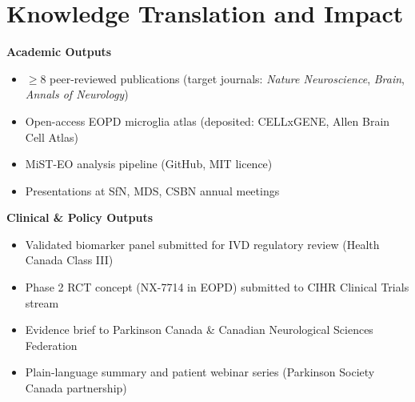 \section{Knowledge Translation and Impact}

\begin{tcolorbox}[cihrbox, title={\faRocket\enspace Expected Outputs and KT Pathways}]
  \begin{minipage}[t]{0.47\linewidth}
    \textbf{Academic Outputs}
    \begin{itemize}[leftmargin=12pt, itemsep=1pt, topsep=2pt, parsep=0pt]
      \item $\geq$8 peer-reviewed publications (target journals: \textit{Nature Neuroscience}, \textit{Brain}, \textit{Annals of Neurology})
      \item Open-access EOPD microglia atlas (deposited: CELLxGENE, Allen Brain Cell Atlas)
      \item MiST-EO analysis pipeline (GitHub, MIT licence)
      \item Presentations at SfN, MDS, CSBN annual meetings
    \end{itemize}
  \end{minipage}%
  \hfill
  \begin{minipage}[t]{0.47\linewidth}
    \textbf{Clinical \& Policy Outputs}
    \begin{itemize}[leftmargin=12pt, itemsep=1pt, topsep=2pt, parsep=0pt]
      \item Validated biomarker panel submitted for IVD regulatory review (Health Canada Class III)
      \item Phase 2 RCT concept (NX-7714 in EOPD) submitted to CIHR Clinical Trials stream
      \item Evidence brief to Parkinson Canada \& Canadian Neurological Sciences Federation
      \item Plain-language summary and patient webinar series (Parkinson Society Canada partnership)
    \end{itemize}
  \end{minipage}
\end{tcolorbox}

